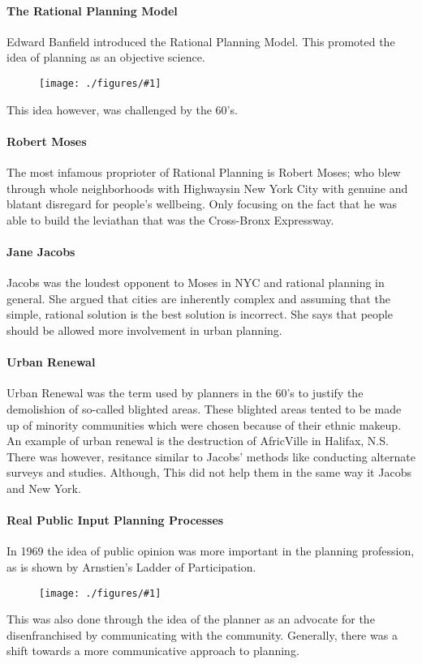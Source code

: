 \documentclass[12pt]{book}
\newcommand{\incimg}[2]{%
       \begin{figure}[h]
               \centering
               \texttt{[image: ./figures/\#1]}
       \end{figure}
}
\begin{document}
\paragraph{The Rational Planning Model}
Edward Banfield introduced the Rational Planning Model. This promoted the idea of 
planning as an objective science.
\incimg{rationalplanning}{0.4}

This idea however, was challenged by the 60's.
\paragraph{Robert Moses}
The most infamous proprioter of Rational Planning is Robert Moses; who blew 
through whole neighborhoods with Highwaysin New York City with 
genuine and blatant disregard for people's wellbeing. Only focusing on
the fact that he was able to build the leviathan that was the Cross-Bronx Expressway.

\paragraph{Jane Jacobs}
Jacobs was the loudest opponent to Moses in NYC and rational planning in general.
She argued that cities are inherently complex and assuming that the simple, rational
solution is the best solution is incorrect. She says that people should be allowed
more involvement in urban planning.

\paragraph{Urban Renewal}
Urban Renewal was the term used by planners in the 60's to justify the demolishion
of so-called blighted areas. These blighted areas tented to be made up of 
minority communities which were chosen because of their ethnic makeup. An example
of urban renewal is the destruction of AfricVille in Halifax, N.S. There was
however, resitance similar to Jacobs' methods like conducting alternate surveys and
studies. Although, This did not help them in the same way it Jacobs and New York.

\paragraph{Real Public Input Planning Processes}
In 1969 the idea of public opinion was more important in the planning profession, as is
shown by Arnstien's Ladder of Participation.
\incimg{ladder}{0.4}

This was also done through the idea of the planner as an advocate for the
disenfranchised by communicating with the community. Generally, there was a shift
towards a more communicative approach to planning.
\end{document}
